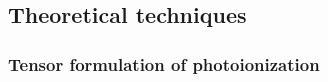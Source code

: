 \documentclass[10pt]{article}
\begin{document}





\subsection{Theoretical techniques\label{sec:theoretical-techniques}}



\subsubsection{Tensor formulation of photoionization\label{sec:tensor-formulation}}
\end{document}
